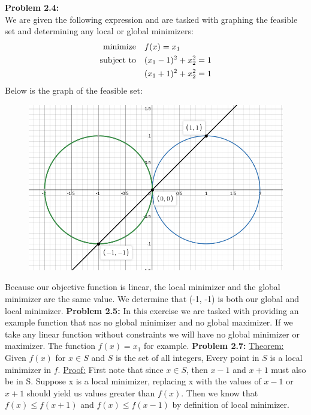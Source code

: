 \documentclass{article}
\begin{document}
 
\pagestyle{fancy}

\textbf{Problem 2.4:} \\
We are given the following expression and are tasked with graphing the feasible set and determining any local or global minimizers:
\begin{align*}
    \text{minimize} &\null \quad f(x) = x_1 \\
    \text{subject to} &\null \quad (x_1 - 1)^2 + x_2^2 = 1 \\ 
    &\null \quad (x_1+1)^2 + x_2^2 = 1
\end{align*}
Below is the graph of the feasible set:

\begin{figure}[H]
    \centering
    \includegraphics[scale = 0.40]{desmos1.png}
\end{figure}
Because our objective function is linear, the local minimizer and the global minimizer are the same value. We determine that (-1, -1) is both our global and local minimizer.
\break
\break
\textbf{Problem 2.5:} In this exercise we are tasked with providing an example function that nas no global minimizer and no global maximizer. If we take any linear function without constraints we will have no global minimizer or maximizer. The function $f(x) = x_1$ for example.
\break \break
\textbf{Problem 2.7:} \underline{Theorem:} Given $f(x)$ for $x \in S$ and $S$ is the set of all integers, Every point in $S$ is a local minimizer in $f$.
\newline
\underline{Proof:} First note that since $x \in S$, then $x-1$ and $x+1$ must also be in S.  Suppose x is a local minimizer, replacing x with the values of $x-1$ or $x+1$ should yield us values greater than $f(x)$. Then we know that $f(x) \leq f(x+1)$ and $f(x) \leq f(x-1)$ by definition of local minimizer. 
\end{document}
